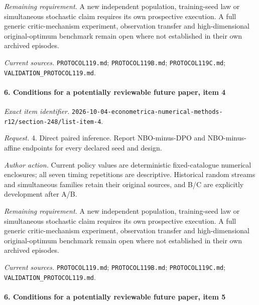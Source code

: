 \par\emph{Remaining requirement.} A new independent population, training-seed law or simultaneous stochastic claim requires its own prospective execution. A full generic critic-mechanism experiment, observation transfer and high-dimensional original-optimum benchmark remain open where not established in their own archived episodes.

\par\emph{Current sources.} \nolinkurl{PROTOCOL119.md}; \nolinkurl{PROTOCOL119B.md}; \nolinkurl{PROTOCOL119C.md}; \nolinkurl{VALIDATION_PROTOCOL119.md}.

\paragraph{6. Conditions for a potentially reviewable future paper, item 4}

\emph{Exact item identifier.} \nolinkurl{2026-10-04-econometrica-numerical-methods-r12/section-248/list-item-4}.

\par\emph{Request.} 4. Direct paired inference. Report NBO-minus-DPO and NBO-minus-affine endpoints for every declared seed and design.

\par\emph{Author action.} Current policy values are deterministic fixed-catalogue numerical enclosures; all seven timing repetitions are descriptive. Historical random streams and simultaneous families retain their original sources, and B/\allowbreak{}C are explicitly development after A/\allowbreak{}B.

\par\emph{Remaining requirement.} A new independent population, training-seed law or simultaneous stochastic claim requires its own prospective execution. A full generic critic-mechanism experiment, observation transfer and high-dimensional original-optimum benchmark remain open where not established in their own archived episodes.

\par\emph{Current sources.} \nolinkurl{PROTOCOL119.md}; \nolinkurl{PROTOCOL119B.md}; \nolinkurl{PROTOCOL119C.md}; \nolinkurl{VALIDATION_PROTOCOL119.md}.

\paragraph{6. Conditions for a potentially reviewable future paper, item 5}

